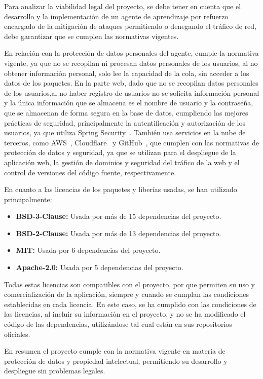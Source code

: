 Para analizar la viabilidad legal del proyecto, se debe tener en cuenta que el desarrollo y la implementación de un agente de aprendizaje por refuerzo encargado de la mitigación de ataques permitiendo o denegando el tráfico de red, debe garantizar que se cumplen las normativas vigentes.

En relación con la protección de datos personales del agente, cumple la normativa vigente, ya que no se recopilan ni procesan datos personales de los usuarios, al no obtener información personal, solo lee la capacidad de la cola, sin acceder a los datos de los paquetes. En la parte web, dado que no se recopilan datos personales de los usuarios,al no haber registro de usuarios no se solicita información personal y la única información que se almacena es el nombre de usuario y la contraseña, que se almacenan de forma segura en la base de datos, cumpliendo las mejores prácticas de seguridad, principalmente la autentificación y autorización de los usuarios, ya que utiliza Spring Security~\cite{SpringSecurity}.
También usa servicios en la nube de terceros, como AWS~\cite{PPAWS}, Cloudflare~\cite{PPCloudflare} y GitHub~\cite{PPGithub}, que cumplen con las normativas de protección de datos y seguridad, ya que se utilizan para el despliegue de la aplicación web, la gestión de dominios y seguridad del tráfico de la web y el control de versiones del código fuente, respectivamente.

En cuanto a las licencias de los paquetes y liberías usadas, se han utilizado principalmente:
\begin{itemize}
    \item \textbf{BSD-3-Clause:} Usada por más de 15 dependencias del proyecto.
    \item \textbf{BSD-2-Clause:} Usada por más de 13 dependencias del proyecto.
    \item \textbf{MIT:} Usada por 6 dependencias del proyecto.
    \item \textbf{Apache-2.0:} Usada por 5 dependencias del proyecto.
\end{itemize}
Todas estas licencias son compatibles con el proyecto, por que permiten su uso y comercialización de la aplicación, siempre y cuando se cumplan las condiciones establecidas en cada licencia. En este caso, se ha cumplido con las condiciones de las licencias, al incluir su información en el proyecto, y no se ha modificado el código de las dependencias, utilizándose tal cual están en sus repositorios oficiales.

En resumen el proyecto cumple con la normativa vigente en materia de protección de datos y propiedad intelectual, permitiendo su desarrollo y despliegue sin problemas legales.